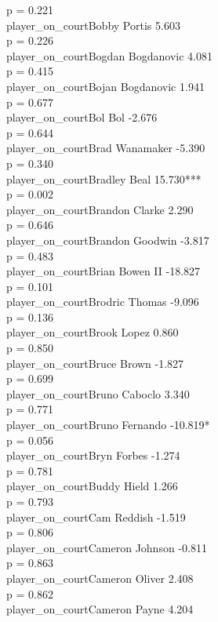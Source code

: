 \documentclass[
  landscape]{article}
\begin{document}
p = 0.221\\
player\_on\_courtBobby Portis 5.603\\
p = 0.226\\
player\_on\_courtBogdan Bogdanovic 4.081\\
p = 0.415\\
player\_on\_courtBojan Bogdanovic 1.941\\
p = 0.677\\
player\_on\_courtBol Bol -2.676\\
p = 0.644\\
player\_on\_courtBrad Wanamaker -5.390\\
p = 0.340\\
player\_on\_courtBradley Beal 15.730***\\
p = 0.002\\
player\_on\_courtBrandon Clarke 2.290\\
p = 0.646\\
player\_on\_courtBrandon Goodwin -3.817\\
p = 0.483\\
player\_on\_courtBrian Bowen II -18.827\\
p = 0.101\\
player\_on\_courtBrodric Thomas -9.096\\
p = 0.136\\
player\_on\_courtBrook Lopez 0.860\\
p = 0.850\\
player\_on\_courtBruce Brown -1.827\\
p = 0.699\\
player\_on\_courtBruno Caboclo 3.340\\
p = 0.771\\
player\_on\_courtBruno Fernando -10.819*\\
p = 0.056\\
player\_on\_courtBryn Forbes -1.274\\
p = 0.781\\
player\_on\_courtBuddy Hield 1.266\\
p = 0.793\\
player\_on\_courtCam Reddish -1.519\\
p = 0.806\\
player\_on\_courtCameron Johnson -0.811\\
p = 0.863\\
player\_on\_courtCameron Oliver 2.408\\
p = 0.862\\
player\_on\_courtCameron Payne 4.204\\
\end{document}

